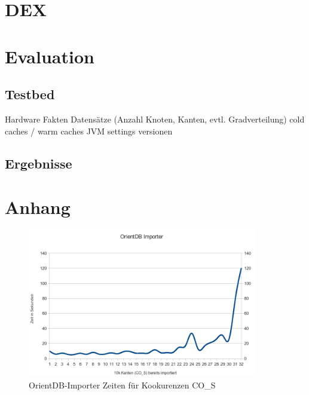 \documentclass[11pt, a4paper, oneside]{article} %
\begin{document}
\section{DEX}

\section{Evaluation}

\subsection{Testbed}

Hardware Fakten
Datensätze (Anzahl Knoten, Kanten, evtl. Gradverteilung)
cold caches / warm caches
JVM settings
versionen

\subsection{Ergebnisse}



\newpage
\onecolumn

\section{Anhang}

\begin{figure}[htbp]
	\centering
	\includegraphics[width=10cm]{OrientImporter.png} 
	\caption{OrientDB-Importer Zeiten für Kookurenzen CO\_{}S}
	\label{fig:orientdb_import}
\end{figure}
\end{document}
